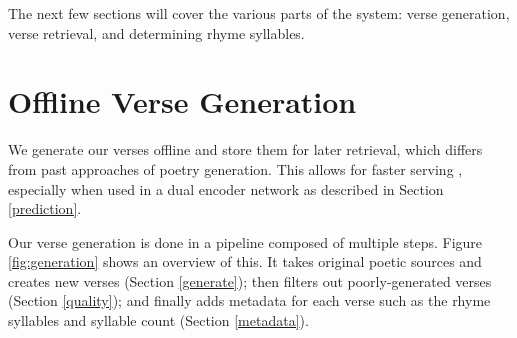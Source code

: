 \documentclass[11pt]{article}
\begin{document}
The next few sections will cover the various parts of the system: verse generation, verse retrieval, and determining rhyme syllables.

\section{Offline Verse Generation}\label{verse_generation}

We generate our verses offline and store them for later retrieval, which differs from past approaches of poetry generation.
This allows for faster serving \cite{henderson2017}, especially when used in a dual encoder network as described in Section \ref{prediction}.

Our verse generation is done in a pipeline composed of multiple steps.
Figure \ref{fig:generation} shows an overview of this.
It takes original poetic sources and creates new verses (Section \ref{generate}); then filters out poorly-generated verses (Section \ref{quality}); and finally adds metadata for each verse such as the rhyme syllables and syllable count (Section \ref{metadata}).
\end{document}

